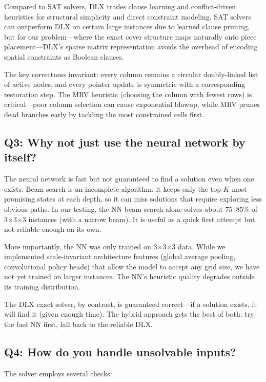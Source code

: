 \documentclass[11pt]{article}
\begin{document}
Compared to SAT solvers, DLX trades clause learning and conflict-driven heuristics for structural simplicity and direct constraint modeling. SAT solvers can outperform DLX on certain large instances due to learned clause pruning, but for our problem---where the exact cover structure maps naturally onto piece placement---DLX's sparse matrix representation avoids the overhead of encoding spatial constraints as Boolean clauses.

The key correctness invariant: every column remains a circular doubly-linked list of active nodes, and every pointer update is symmetric with a corresponding restoration step. The MRV heuristic (choosing the column with fewest rows) is critical---poor column selection can cause exponential blowup, while MRV prunes dead branches early by tackling the most constrained cells first.

\subsection*{Q3: Why not just use the neural network by itself?}

The neural network is fast but not guaranteed to find a solution even when one exists. Beam search is an incomplete algorithm: it keeps only the top-$K$ most promising states at each depth, so it can miss solutions that require exploring less obvious paths. In our testing, the NN beam search alone solves about 75--85\% of 3$\times$3$\times$3 instances (with a narrow beam). It is useful as a quick first attempt but not reliable enough on its own.

More importantly, the NN was only trained on 3$\times$3$\times$3 data. While we implemented scale-invariant architecture features (global average pooling, convolutional policy heads) that allow the model to accept any grid size, we have not yet trained on larger instances. The NN's heuristic quality degrades outside its training distribution.

The DLX exact solver, by contrast, is guaranteed correct---if a solution exists, it will find it (given enough time). The hybrid approach gets the best of both: try the fast NN first, fall back to the reliable DLX.

\subsection*{Q4: How do you handle unsolvable inputs?}

The solver employs several checks:
\end{document}
